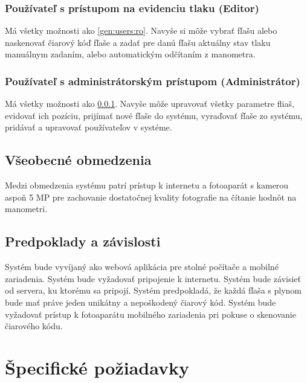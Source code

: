 \documentclass{zah}
\begin{document}
\subsubsection{Používateľ s prístupom na evidenciu tlaku (Editor)}
\label{gen:users:meter}

Má všetky možnosti ako \ref{gen:users:ro}. Navyše si môže vybrať fľašu alebo naskenovať čiarový kóď fľaše a zadať pre danú fľašu aktuálny stav tlaku manuálnym zadaním, alebo automatickým odčítaním z manometra.

\subsubsection{Používateľ s administrátorským prístupom (Administrátor)}
\label{gen:users:admin}

Má všetky možnosti ako \ref{gen:users:meter}. Navyše môže upravovať všetky parametre fliaš, evidovať ich pozíciu, prijímať nové fľaše do systému, vyraďovať fľaše zo systému, pridávať a upravovať používateľov v systéme.

\subsection{Všeobecné obmedzenia}
\label{gen:constraints}

Medzi obmedzenia systému patrí prístup k internetu a fotoaparát s kamerou aspoň 5 MP pre zachovanie dostatočnej kvality fotografie na čítanie hodnôt na manometri. 

\subsection{Predpoklady a závislosti}
\label{gen:deps}

Systém bude vyvíjaný ako webová aplikácia pre stolné počítače a mobilné zariadenia. Systém bude vyžadovať pripojenie k internetu. Systém bude závisieť od servera, ku ktorému sa pripojí. Systém predpokladá, že každá fľaša s plynom bude mať práve jeden unikátny a nepoškodený čiarový kód. Systém bude vyžadovať prístup k fotoaparátu mobilného zariadenia pri pokuse o skenovanie čiarového kódu.

\cleardoublepage
\section{Špecifické požiadavky}
\label{reqs}
\end{document}

